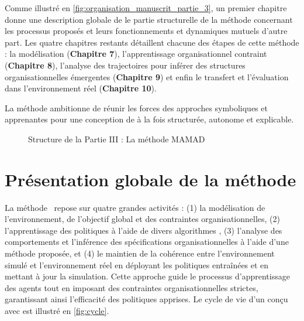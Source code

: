 \medskip

\noindent
Comme illustré en \autoref{fig:organisation_manuscrit_partie_3}, un premier chapitre donne une description globale de le partie structurelle de la méthode concernant les processus proposés et leurs fonctionnements et dynamiques mutuels d'autre part. Les quatre chapitres restants détaillent chacune des étapes de cette méthode :
la modélisation (\textbf{Chapitre 7}), l'apprentissage organisationnel contraint (\textbf{Chapitre 8}), l'analyse des trajectoires pour inférer des structures organisationnelles émergentes (\textbf{Chapitre 9}) et enfin le transfert et l'évaluation dans l'environnement réel (\textbf{Chapitre 10}).

La méthode  ambitionne de réunir les forces des approches symboliques et apprenantes pour une conception de  à la fois structurée, autonome et explicable.

\begin{figure}[h!]
    \centering
    \resizebox{\linewidth}{!}{%
        
    }
    \caption{Structure de la Partie III : La méthode MAMAD}
    \label{fig:organisation_manuscrit_partie_3}
\end{figure}



\chapter{Présentation globale de la méthode}
\label{sec:mamad}

% 
% 
% 
% 

La méthode ~\footnotemark[1] repose sur quatre grandes activités : (1) la modélisation de l'environnement, de l'objectif global et des contraintes organisationnelles, (2) l'apprentissage des politiques à l'aide de divers algorithmes , (3) l'analyse des comportements et l'inférence des spécifications organisationnelles à l'aide d'une méthode proposée, et (4) le maintien de la cohérence entre l'environnement simulé et l'environnement réel en déployant les politiques entraînées et en mettant à jour la simulation. Cette approche guide le processus d'apprentissage des agents tout en imposant des contraintes organisationnelles strictes, garantissant ainsi l'efficacité des politiques apprises. Le cycle de vie d'un  conçu avec  est illustré en \autoref{fig:cycle}.

